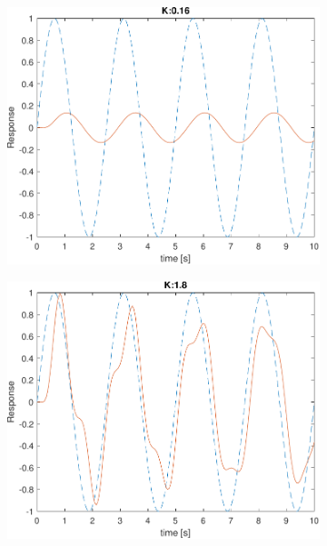 \begin{figure}[t!]
	\begin{subfigure}{0.33\linewidth}
		\centering
		\includegraphics[width=0.95\linewidth]{../code/pupillary/sine/figs/result_gain_0.16}
		\caption{}
	\end{subfigure}\hfill
	\begin{subfigure}{0.33\linewidth}
		\centering
		\includegraphics[width=0.95\linewidth]{../code/pupillary/sine/figs/result_gain_1.8}
		\caption{}
	\end{subfigure}\hfill
	\begin{subfigure}{0.33\linewidth}
		\centering

\end{subfigure}
\end{figure}
